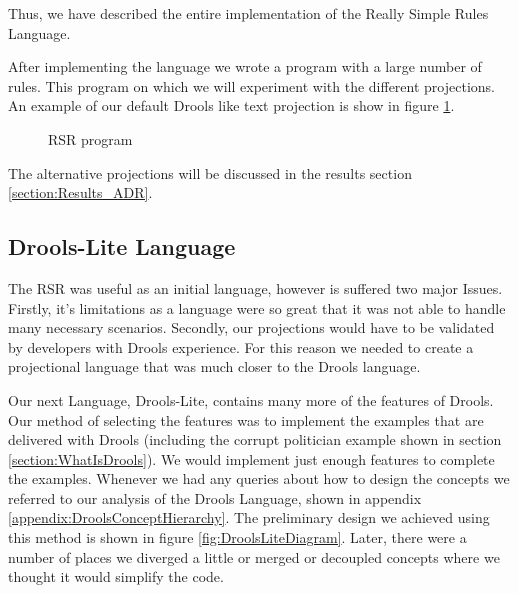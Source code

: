 Thus, we have described the entire implementation of the Really Simple Rules Language.

After implementing the language we wrote a program with a large number of rules.
This program on which we will experiment with the different projections.
An example of our default Drools like text projection is show in figure \ref{fig:RSRProgram}.

\begin{figure}[h]
    \centering
    \caption{RSR program}
    \label{fig:RSRProgram}
\end{figure}

The alternative projections will be discussed in the results section \ref{section:Results_ADR}.

\subsection{Drools-Lite Language}\label{section:DroolsLite}

The RSR was useful as an initial language, however is suffered two major Issues.
Firstly, it's limitations as a language were so great that it was not able to handle many necessary scenarios.
Secondly, our projections would have to be validated by developers with Drools experience.
For this reason we needed to create a projectional language that was much closer to the Drools language.

Our next Language, Drools-Lite, contains many more of the features of Drools.
Our method of selecting the features was to implement the examples that are delivered with Drools (including the corrupt politician example shown in section \ref{section:WhatIsDrools}).
We would implement just enough features to complete the examples.
Whenever we had any queries about how to design the concepts we referred to our analysis of the Drools Language, shown in appendix \ref{appendix:DroolsConceptHierarchy}.
The preliminary design we achieved using this method is shown in figure \ref{fig:DroolsLiteDiagram}.
Later, there were a number of places we diverged a little or merged or decoupled concepts where we thought it would simplify the code.

